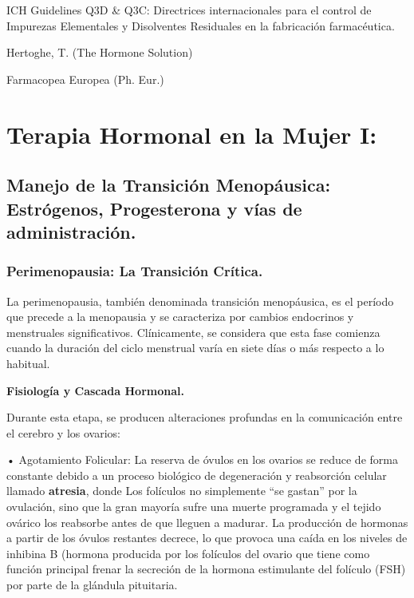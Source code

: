 \documentclass[
  spanish,
]{article}
\begin{document}
ICH Guidelines Q3D \& Q3C: Directrices internacionales para el control de Impurezas Elementales y Disolventes Residuales en la fabricación farmacéutica.

Hertoghe, T. (The Hormone Solution)

Farmacopea Europea (Ph. Eur.)

\section{Terapia Hormonal en la Mujer I:}\label{terapia-hormonal-en-la-mujer-i}

\subsection{Manejo de la Transición Menopáusica: Estrógenos, Progesterona y vías de administración.}\label{manejo-de-la-transiciuxf3n-menopuxe1usica-estruxf3genos-progesterona-y-vuxedas-de-administraciuxf3n.}

\subsubsection{Perimenopausia: La Transición Crítica.}\label{perimenopausia-la-transiciuxf3n-cruxedtica.}

La perimenopausia, también denominada transición menopáusica, es el período que precede a la menopausia y se caracteriza por cambios endocrinos y menstruales significativos. Clínicamente, se considera que esta fase comienza cuando la duración del ciclo menstrual varía en siete días o más respecto a lo habitual.

\textbf{Fisiología y Cascada Hormonal.}

Durante esta etapa, se producen alteraciones profundas en la comunicación entre el cerebro y los ovarios:

• Agotamiento Folicular: La reserva de óvulos en los ovarios se reduce de forma constante debido a un proceso biológico de degeneración y reabsorción celular llamado \textbf{atresia}, donde Los folículos no simplemente ``se gastan'' por la ovulación, sino que la gran mayoría sufre una muerte programada y el tejido ovárico los reabsorbe antes de que lleguen a madurar. La producción de hormonas a partir de los óvulos restantes decrece, lo que provoca una caída en los niveles de inhibina B (hormona producida por los folículos del ovario que tiene como función principal frenar la secreción de la hormona estimulante del folículo (FSH) por parte de la glándula pituitaria.
\end{document}
